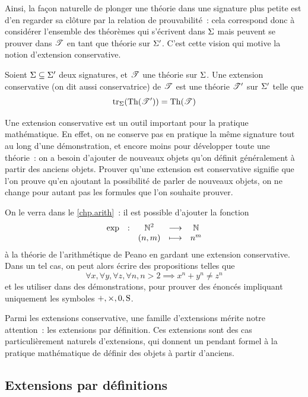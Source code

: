 Ainsi, la façon naturelle de plonger une théorie dans une signature plus petite
est d'en regarder sa clôture par la relation de prouvabilité~: cela correspond
donc à considérer l'ensemble des théorèmes qui s'écrivent dans $\Sigma$ mais
peuvent se prouver dans $\mathscr T$ en tant que théorie sur $\Sigma'$. C'est cette
vision qui motive la notion d'extension conservative.

\begin{definition}\label{def.conserv.ext}
  Soient $\Sigma\subseteq \Sigma'$ deux signatures, et $\mathscr T$ une théorie sur
  $\Sigma$.
  Une extension conservative (on dit aussi conservatrice) de $\mathscr T$ est
  une théorie $\mathscr T'$ sur $\Sigma'$ telle que
  \[\operatorname{tr}_\Sigma(\operatorname{Th}(\mathscr T')) = \operatorname{Th}(\mathscr T)\]
\end{definition}

Une extension conservative est un outil important pour la pratique mathématique.
En effet, on ne conserve pas en pratique la même signature tout au long d'une
démonstration, et encore moins pour développer toute une théorie~: on a besoin
d'ajouter de nouveaux objets qu'on définit généralement à partir des anciens
objets. Prouver qu'une extension est conservative signifie que l'on prouve qu'en
ajoutant la possibilité de parler de nouveaux objets, on ne change pour autant
pas les formules que l'on souhaite prouver.

\begin{example}
  On le verra dans le \cref{chp.arith}~: il est possible d'ajouter la fonction
  \[\makeFun{\exp}{\bN^2}{\bN}{(n,m)}{n^m}\]
  à la théorie de l'arithmétique de Peano en gardant une extension conservative.
  Dans un tel cas, on peut alors écrire des propositions telles que
  \[\forall x, \forall y, \forall z, \forall n, n > 2 \implies
  x^n + y^n \neq z^n\]
  et les utiliser dans des démonstrations, pour prouver des énoncés impliquant
  uniquement les symboles $+, \times, 0, \operatorname{S}$.
\end{example}

Parmi les extensions conservative, une famille d'extensions mérite notre
attention~: les extensions par définition. Ces extensions sont des cas
particulièrement naturels d'extensions, qui donnent un pendant formel à la
pratique mathématique de définir des objets à partir d'anciens.

\subsection{Extensions par définitions}

